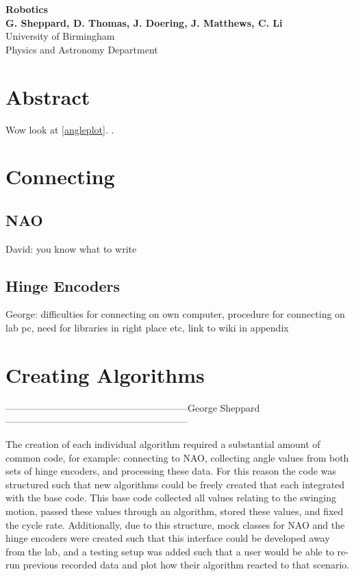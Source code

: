 \documentclass[11pt]{article}
\begin{document}
\begin{titlepage}
    \begin{center}
        \vspace*{1cm}
        \Huge
        \textbf{Robotics} \\
        \vspace{0.5cm}
        \LARGE
        \vspace{1.5cm}
        \textbf{G. Sheppard, D. Thomas, J. Doering, J. Matthews, C. Li} \\
        \vfill
        \vspace{0.8cm}
        \Large
        University of Birmingham\\
        Physics and Astronomy Department\\
    \end{center}
\end{titlepage}

\tableofcontents

\section{Abstract}
Wow look at \ref{angleplot}. \cite{Bae2006}.

\section{Connecting}
\subsection{NAO}
David: you know what to write
\subsection{Hinge Encoders}
George: difficulties for connecting on own computer, procedure for connecting on lab pc, need for libraries in right place etc, link to wiki in appendix

\section{Creating Algorithms}
---------------------------------------------------------George Sheppard---------------------------------------------------------

The creation of each individual algorithm required a substantial amount of common code, for example: connecting to NAO, collecting angle values from both sets of hinge encoders, and processing these data. For this reason the code was structured such that new algorithms could be freely created that each integrated with the base code. This base code collected all values relating to the swinging motion, passed these values through an algorithm, stored these values, and fixed the cycle rate. Additionally, due to this structure, mock classes for NAO and the hinge encoders were created such that this interface could be developed away from the lab, and a testing setup was added such that a user would be able to re-run previous recorded data and plot how their algorithm reacted to that scenario.\\
\end{document}
